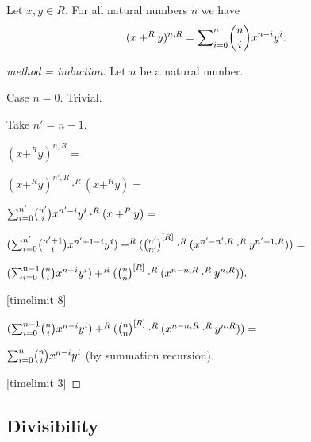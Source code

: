 \documentclass[11pt]{article}
\begin{document}
\begin{forthel}
\begin{theorem}
Let $x,y \in R$. For all natural numbers $n$ we have
$$(x +^{R} y)^{n,R} = \binsum{n}{n}{x}{y}{R}.$$
\end{theorem}
\begin{proof}[method = induction]
Let $n$ be a natural number.

Case $n = 0$. Trivial.

Take $n' = n-1$.

$(x +^{R} y)^{n,R} =$

$(x +^{R} y)^{n',R} \cdot^{R} (x +^{R} y) =$

$\binsum{n'}{n'}{x}{y}{R} \cdot^{R} (x +^{R} y) =$

$(\binsum{n'}{n'+1}{x}{y}{R}) +^{R} (\cho{n'}{n'}^{[R]} \cdot^{R} (x^{n'-n',R} \cdot^{R} y^{n'+1,R})) =$

$(\binsum{n-1}{n}{x}{y}{R}) +^{R} (\cho{n}{n}^{[R]} \cdot^{R} (x^{n-n,R} \cdot^{R} y^{n,R})).$

[timelimit 8]


$(\binsum{n-1}{n}{x}{y}{R}) +^{R} (\cho{n}{n}^{[R]} \cdot^{R} (x^{n-n,R} \cdot^{R} y^{n,R})) =$

$\binsum{n}{n}{x}{y}{R}$ (by summation recursion).

[timelimit 3]

\end{proof}

\end{forthel}

\subsection{Divisibility} 
\end{document}
